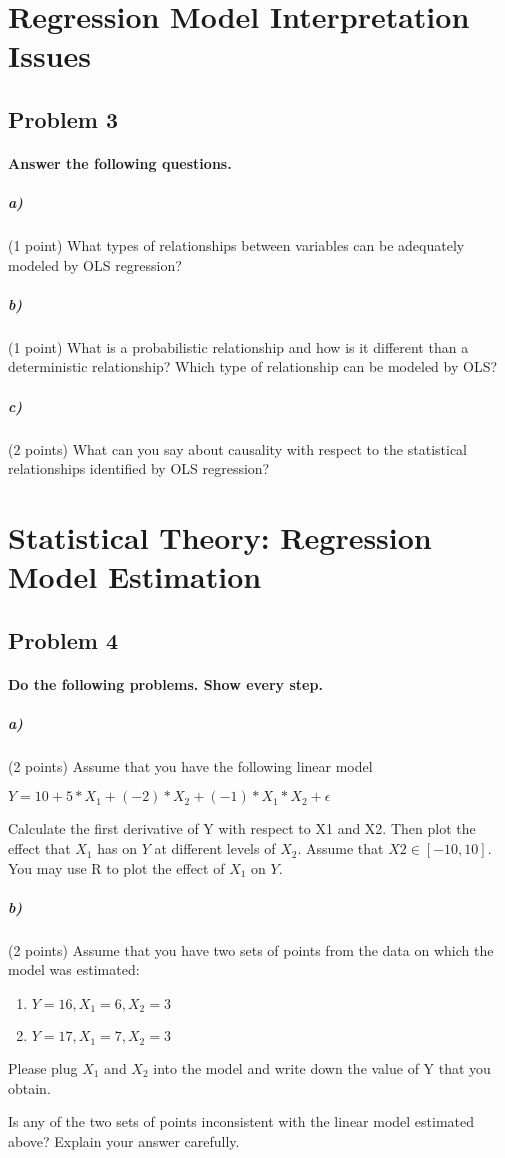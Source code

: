 \documentclass[12pt,letter]{article}
\begin{document}
\section*{Regression Model Interpretation Issues}

\subsection*{Problem 3}

\paragraph{Answer the following questions.}

\subparagraph{a)} (1 point) What types of relationships between variables can be adequately modeled by OLS regression?

\subparagraph{b)} (1 point) What is a probabilistic relationship and how is it different than a deterministic relationship? Which type of relationship can be modeled by OLS?

\subparagraph{c)} (2 points) What can you say about causality with respect to the statistical relationships identified by OLS regression?



\section*{Statistical Theory: Regression Model Estimation}

\subsection*{Problem 4}

\paragraph{Do the following problems. Show every step.}

\subparagraph{a)} (2 points) Assume that you have the following linear model

$Y = 10 + 5*X_1 + (-2)*X_2 + (-1)*X_1*X_2 + \epsilon$

Calculate the first derivative of Y with respect to X1 and X2. Then plot the effect that $X_1$ has on $Y$ at different levels of $X_2$. Assume that $X2 \in [-10,10]$. You may use R to plot the effect of $X_1$ on $Y$.

\subparagraph{b)} (2 points) Assume that you have two sets of points from the data on which the model was estimated:

\begin{enumerate}
	\item $Y = 16, X_1=6, X_2=3$
	\item $Y = 17, X_1=7, X_2=3$
\end{enumerate}

Please plug $X_1$ and $X_2$ into the model and write down the value of Y that you obtain.

Is any of the two sets of points inconsistent with the linear model estimated above? Explain your answer carefully.
\end{document}
